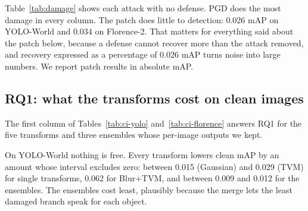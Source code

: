 \documentclass[11pt]{article}
\newcommand{\yw}{YOLO-World}
\newcommand{\fl}{Florence-2}
\begin{document}
Table~\ref{tab:damage} shows each attack with no defense. PGD does the most
damage in every column. The patch does little to detection: 0.026 mAP on
\yw{} and 0.034 on \fl{}. That matters for everything said about the patch
below, because a defense cannot recover more than the attack removed, and
recovery expressed as a percentage of 0.026 mAP turns noise into large
numbers. We report patch results in absolute mAP.

\subsection{RQ1: what the transforms cost on clean images}
\label{sec:rq1}

\begin{table}[t]
\centering
\caption{\yw{}, first 1{,}000 images of val2017. Clean cost is mAP with the
transform on clean images minus clean mAP. Recovery is defended minus
attacked mAP. Brackets are 95\% paired bootstrap intervals; bold marks an
interval that excludes zero.}
\label{tab:ci-yolo}
\end{table}

\begin{table}[t]
\centering
\caption{\fl{} detection, same images and conventions as
Table~\ref{tab:ci-yolo}. Scores are the geometric pseudo-scores of
Sec.~\ref{sec:disclosures}.}
\label{tab:ci-florence}
\end{table}

The first column of Tables~\ref{tab:ci-yolo} and~\ref{tab:ci-florence}
answers RQ1 for the five transforms and three ensembles whose per-image
outputs we kept.

On \yw{} nothing is free. Every transform lowers clean mAP by an amount whose
interval excludes zero: between 0.015 (Gaussian) and 0.029 (TVM) for single
transforms, 0.062 for Blur+TVM, and between 0.009 and 0.012 for the
ensembles. The ensembles cost least, plausibly because the merge lets the least damaged
branch speak for each object.
\end{document}
